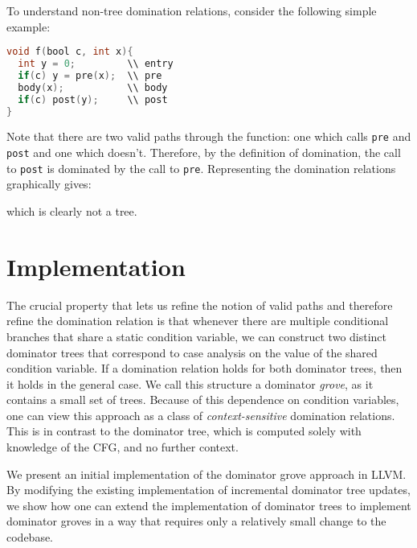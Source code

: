 \documentclass[a4paper,twocolumn]{article}
\begin{document}
To understand non-tree domination relations, consider the following simple
example: 
\begin{minipage}{\linewidth}
\begin{lstlisting}[language=C]
void f(bool c, int x){
  int y = 0;         \\ entry
  if(c) y = pre(x);  \\ pre
  body(x);           \\ body	
  if(c) post(y);     \\ post
}
\end{lstlisting}
\end{minipage}
Note that there are two valid paths through the function: one which calls
\texttt{pre} and \texttt{post} and one which doesn't. Therefore, by the
definition of domination, the call to \texttt{post} is dominated by the call to
\texttt{pre}. Representing the domination relations graphically gives: 
\begin{center}
\end{center} 
which is clearly not a tree.

\section*{Implementation}
The crucial property that lets us refine the notion of valid paths and
therefore refine the domination relation is that whenever there are multiple
conditional branches that share a static condition variable, we can construct
two distinct dominator trees that correspond to case analysis on the value of
the shared condition variable. If a domination relation holds for both
dominator trees, then it holds in the general case. We call this structure a
dominator \emph{grove}, as it contains a small set of trees. Because of this 
dependence on condition variables, one can view this approach as a class of 
\emph{context-sensitive} domination relations. This is in contrast to the
dominator tree, which is computed solely with knowledge of the CFG, and no
further context.

We present an initial implementation of the dominator grove approach in LLVM.
By modifying the existing implementation of incremental dominator tree updates,
we show how one can extend the implementation of dominator trees to implement
dominator groves in a way that requires only a relatively small change to the
codebase. 
\end{document}
